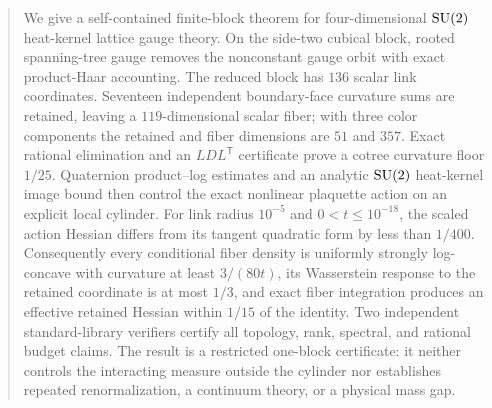 \begin{abstract}
We give a self-contained finite-block theorem for four-dimensional $\SUtwo$
heat-kernel lattice gauge theory.  On the side-two cubical block, rooted
spanning-tree gauge removes the nonconstant gauge orbit with exact product-Haar
accounting.  The reduced block has $136$ scalar link coordinates.  Seventeen
independent boundary-face curvature sums are retained, leaving a
$119$-dimensional scalar fiber; with three color components the retained and
fiber dimensions are $51$ and $357$.  Exact rational elimination and an
$LDL^{\mathsf T}$ certificate prove a cotree curvature floor $1/25$.
Quaternion product--log estimates and an analytic $\SUtwo$ heat-kernel image
bound then control the exact nonlinear plaquette action on an explicit local
cylinder.  For link radius $10^{-5}$ and $0<t\le10^{-18}$, the scaled action
Hessian differs from its tangent quadratic form by less than $1/400$.
Consequently every conditional fiber density is uniformly strongly
log-concave with curvature at least $3/(80t)$, its Wasserstein response to the
retained coordinate is at most $1/3$, and exact fiber integration produces an
effective retained Hessian within $1/15$ of the identity.  Two independent
standard-library verifiers certify all topology, rank, spectral, and rational
budget claims.  The result is a restricted one-block certificate: it neither
controls the interacting measure outside the cylinder nor establishes
repeated renormalization, a continuum theory, or a physical mass gap.
\end{abstract}
